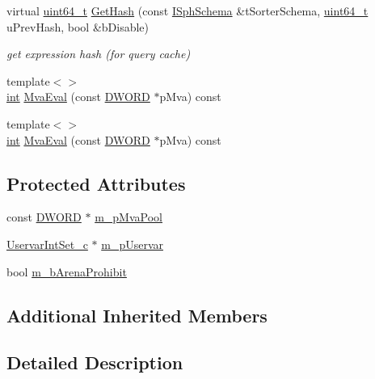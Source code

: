 \begin{DoxyCompactItemize}
virtual \hyperlink{sphinxstd_8h_aaa5d1cd013383c889537491c3cfd9aad}{uint64\-\_\-t} \hyperlink{classExpr__MVAIn__c_a51087124678d26d29debc2fc02bbd48a}{Get\-Hash} (const \hyperlink{classISphSchema}{I\-Sph\-Schema} \&t\-Sorter\-Schema, \hyperlink{sphinxstd_8h_aaa5d1cd013383c889537491c3cfd9aad}{uint64\-\_\-t} u\-Prev\-Hash, bool \&b\-Disable)
\begin{DoxyCompactList}\small\item\em get expression hash (for query cache) \end{DoxyCompactList}\item 
{\footnotesize template$<$$>$ }\\\hyperlink{sphinxexpr_8cpp_a4a26e8f9cb8b736e0c4cbf4d16de985e}{int} \hyperlink{classExpr__MVAIn__c_a053fde6e357230925fe8812dfa9bf4b2}{Mva\-Eval} (const \hyperlink{sphinxstd_8h_a798af1e30bc65f319c1a246cecf59e39}{D\-W\-O\-R\-D} $\ast$p\-Mva) const
\item 
{\footnotesize template$<$$>$ }\\\hyperlink{sphinxexpr_8cpp_a4a26e8f9cb8b736e0c4cbf4d16de985e}{int} \hyperlink{classExpr__MVAIn__c_a5128bbe40e6a886899b0939cdcde8744}{Mva\-Eval} (const \hyperlink{sphinxstd_8h_a798af1e30bc65f319c1a246cecf59e39}{D\-W\-O\-R\-D} $\ast$p\-Mva) const
\end{DoxyCompactItemize}
\subsection*{Protected Attributes}
\begin{DoxyCompactItemize}
\item 
const \hyperlink{sphinxstd_8h_a798af1e30bc65f319c1a246cecf59e39}{D\-W\-O\-R\-D} $\ast$ \hyperlink{classExpr__MVAIn__c_ab673ee7c1d4934597166ac7562143a03}{m\-\_\-p\-Mva\-Pool}
\item 
\hyperlink{classUservarIntSet__c}{Uservar\-Int\-Set\-\_\-c} $\ast$ \hyperlink{classExpr__MVAIn__c_a847441feb20d50541d5cb4ddb7155d89}{m\-\_\-p\-Uservar}
\item 
bool \hyperlink{classExpr__MVAIn__c_aaea1fe0f80dae5bf3657d698ee8a6566}{m\-\_\-b\-Arena\-Prohibit}
\end{DoxyCompactItemize}
\subsection*{Additional Inherited Members}


\subsection{Detailed Description}
